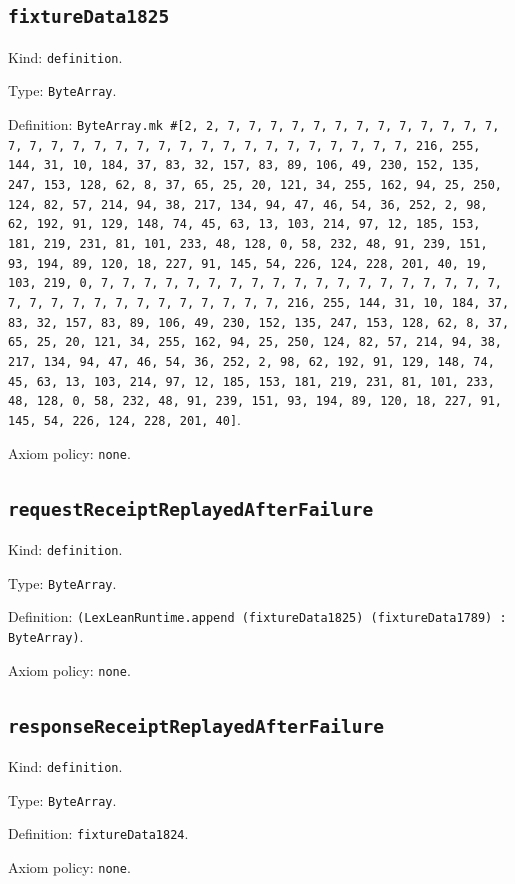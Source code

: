 \documentclass[11pt]{article}
\begin{document}
\subsection*{\texttt{fixtureData1825}}
\noindent Kind: \texttt{definition}.\par
\noindent Type: \texttt{ByteArray}.\par
\noindent Definition: \texttt{ByteArray.mk \#[2, 2, 7, 7, 7, 7, 7, 7, 7, 7, 7, 7, 7, 7, 7, 7, 7, 7, 7, 7, 7, 7, 7, 7, 7, 7, 7, 7, 7, 7, 7, 7, 7, 7, 216, 255, 144, 31, 10, 184, 37, 83, 32, 157, 83, 89, 106, 49, 230, 152, 135, 247, 153, 128, 62, 8, 37, 65, 25, 20, 121, 34, 255, 162, 94, 25, 250, 124, 82, 57, 214, 94, 38, 217, 134, 94, 47, 46, 54, 36, 252, 2, 98, 62, 192, 91, 129, 148, 74, 45, 63, 13, 103, 214, 97, 12, 185, 153, 181, 219, 231, 81, 101, 233, 48, 128, 0, 58, 232, 48, 91, 239, 151, 93, 194, 89, 120, 18, 227, 91, 145, 54, 226, 124, 228, 201, 40, 19, 103, 219, 0, 7, 7, 7, 7, 7, 7, 7, 7, 7, 7, 7, 7, 7, 7, 7, 7, 7, 7, 7, 7, 7, 7, 7, 7, 7, 7, 7, 7, 7, 7, 7, 7, 216, 255, 144, 31, 10, 184, 37, 83, 32, 157, 83, 89, 106, 49, 230, 152, 135, 247, 153, 128, 62, 8, 37, 65, 25, 20, 121, 34, 255, 162, 94, 25, 250, 124, 82, 57, 214, 94, 38, 217, 134, 94, 47, 46, 54, 36, 252, 2, 98, 62, 192, 91, 129, 148, 74, 45, 63, 13, 103, 214, 97, 12, 185, 153, 181, 219, 231, 81, 101, 233, 48, 128, 0, 58, 232, 48, 91, 239, 151, 93, 194, 89, 120, 18, 227, 91, 145, 54, 226, 124, 228, 201, 40]}.\par
\noindent Axiom policy: \texttt{none}.\par
\subsection*{\texttt{requestReceiptReplayedAfterFailure}}
\noindent Kind: \texttt{definition}.\par
\noindent Type: \texttt{ByteArray}.\par
\noindent Definition: \texttt{(LexLeanRuntime.append (fixtureData1825) (fixtureData1789) : ByteArray)}.\par
\noindent Axiom policy: \texttt{none}.\par
\subsection*{\texttt{responseReceiptReplayedAfterFailure}}
\noindent Kind: \texttt{definition}.\par
\noindent Type: \texttt{ByteArray}.\par
\noindent Definition: \texttt{fixtureData1824}.\par
\noindent Axiom policy: \texttt{none}.\par
\end{document}
